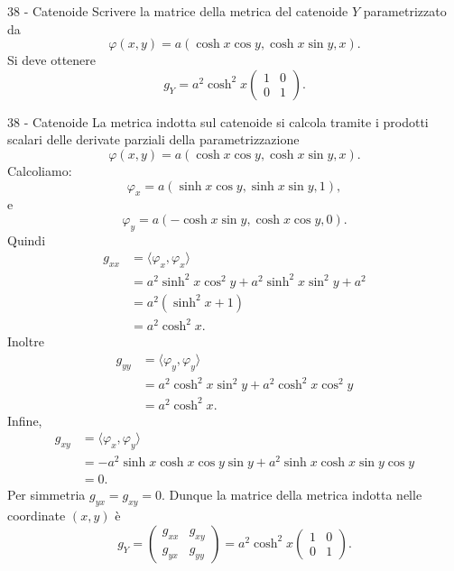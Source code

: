 \documentclass[a4paper]{article}
\begin{document}
\begin{snippetexercise}{38 - Catenoide}
    Scrivere la matrice della metrica del catenoide \(Y\) parametrizzato da
    \[
        \varphi(x,y)
        =
        a\left(
            \cosh x\cos y,
            \cosh x\sin y,
            x
        \right).
    \]
    Si deve ottenere
    \[
        g_Y
        =
        a^2\cosh^2 x
        \begin{pmatrix}
            1 & 0\\
            0 & 1
        \end{pmatrix}.
    \]
\end{snippetexercise}

\begin{snippetsolution}{38 - Catenoide}
    La metrica indotta sul catenoide si calcola tramite i prodotti scalari delle derivate parziali della parametrizzazione
    \[
        \varphi(x,y)
        =
        a\left(
            \cosh x\cos y,
            \cosh x\sin y,
            x
        \right).
    \]
    Calcoliamo:
    \[
        \varphi_x
        =
        a\left(
            \sinh x\cos y,
            \sinh x\sin y,
            1
        \right),
    \]
    e
    \[
        \varphi_y
        =
        a\left(
            -\cosh x\sin y,
            \cosh x\cos y,
            0
        \right).
    \]
    Quindi
    \begin{align*}
        g_{xx}
        &=
        \langle\varphi_x,\varphi_x\rangle\\
        &=
        a^2\sinh^2x\cos^2y
        +
        a^2\sinh^2x\sin^2y
        +
        a^2\\
        &=
        a^2(\sinh^2x+1)\\
        &=
        a^2\cosh^2x.
    \end{align*}
    Inoltre
    \begin{align*}
        g_{yy}
        &=
        \langle\varphi_y,\varphi_y\rangle\\
        &=
        a^2\cosh^2x\sin^2y
        +
        a^2\cosh^2x\cos^2y\\
        &=
        a^2\cosh^2x.
    \end{align*}
    Infine,
    \begin{align*}
        g_{xy}
        &=
        \langle\varphi_x,\varphi_y\rangle\\
        &=
        -a^2\sinh x\cosh x\cos y\sin y
        +
        a^2\sinh x\cosh x\sin y\cos y\\
        &=
        0.
    \end{align*}
    Per simmetria \(g_{yx}=g_{xy}=0\). Dunque la matrice della metrica indotta nelle coordinate \((x,y)\) è
    \[
        g_Y
        =
        \begin{pmatrix}
            g_{xx} & g_{xy}\\
            g_{yx} & g_{yy}
        \end{pmatrix}
        =
        a^2\cosh^2 x
        \begin{pmatrix}
            1 & 0\\
            0 & 1
        \end{pmatrix}.
    \]
\end{snippetsolution}
\end{document}
